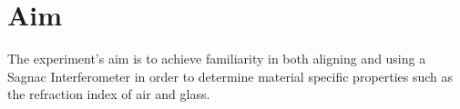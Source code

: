 \section{Aim}
\label{sec:versuchsziel}

The experiment's aim is to achieve familiarity in both aligning and using a Sagnac Interferometer in order to determine material specific properties such as the refraction
index of air and glass. 


